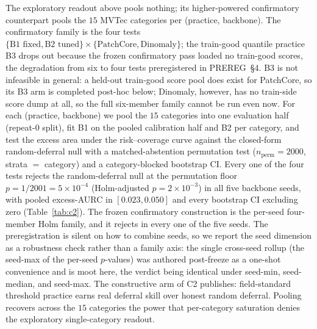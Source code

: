 \documentclass[preprint,11pt]{elsarticle}
\begin{document}
The exploratory readout above pools nothing; its higher-powered confirmatory counterpart pools the
$15$ MVTec categories per (practice, backbone). The confirmatory family is the four tests
$\{\text{B1 fixed},\text{B2 tuned}\}\times\{\text{PatchCore},\text{Dinomaly}\}$; the train-good
quantile practice B3 drops out because the frozen confirmatory pass loaded no train-good scores,
the degradation from six to four tests preregistered in PREREG~\S4. B3 is not infeasible in general:
a held-out train-good score pool does exist for PatchCore, so its B3 arm is completed
post-hoc below; Dinomaly, however, has no train-side score dump at all, so the full six-member
family cannot be run even now. For each (practice, backbone) we pool
the $15$ categories into one evaluation half (repeat-$0$ split), fit B1 on the pooled calibration
half and B2 per category, and test the excess area under the risk--coverage curve against the
closed-form random-deferral null with a matched-abstention permutation test
($n_{\text{perm}}=2000$, strata $=$ category) and a category-blocked bootstrap CI. Every one of the
four tests rejects the random-deferral null at the permutation floor
$p=1/2001=5\times10^{-4}$ (Holm-adjusted $p=2\times10^{-3}$) in all five backbone seeds, with
pooled excess-AURC in $[0.023,0.050]$ and every bootstrap CI excluding zero
(Table~\ref{tab:c2}). The frozen confirmatory construction is the per-seed four-member Holm family,
and it rejects in every one of the five seeds. The preregistration is silent on how to combine
seeds, so we report the seed dimension as a robustness check rather than a family axis: the single
cross-seed rollup (the seed-max of the per-seed $p$-values) was authored post-freeze as a one-shot
convenience and is moot here, the verdict being identical under seed-min, seed-median, and
seed-max. The constructive arm of C2 publishes: field-standard threshold practice earns real
deferral skill over honest random deferral. Pooling recovers across the $15$ categories the power
that per-category saturation denies the exploratory single-category readout.
\end{document}
